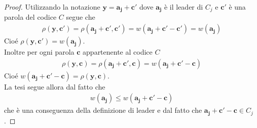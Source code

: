 \begin{proof}
    Utilizzando la notazione $\mathbf{y} = \mathbf{a_{j}} + \mathbf{c'}$ dove $\mathbf{a_{j}}$ è il leader di $C_{j}$ e $\mathbf{c'}$ è una parola del codice $C$ segue che
   \begin{align*}
      \rho (\mathbf{y} ,\mathbf{c'}) = \rho ( \mathbf{a_{j}} + \mathbf{c'} ,\mathbf{c'})
      = w(\mathbf{a_{j}} + \mathbf{c'} - \mathbf{c'}) = w(\mathbf{a_{j}})
   \end{align*}
   Cioé $\rho (\mathbf{y} ,\mathbf{c'}) = w(\mathbf{a_{j}})$. \\
   Inoltre per ogni parola $\mathbf{c}$ appartenente al codice $C$
   \begin{align*}
      \rho (\mathbf{y} ,\mathbf{c}) = \rho ( \mathbf{a_{j}} + \mathbf{c'} ,\mathbf{c})
      = w(\mathbf{a_{j}} + \mathbf{c'} - \mathbf{c})
   \end{align*}
   Cioé $w(\mathbf{a_{j}} + \mathbf{c'} - \mathbf{c}) = \rho(\mathbf{y} ,\mathbf{c})$. \\
   La tesi segue allora dal fatto che
   \begin{align*}
      w(\mathbf{a_{j}}) \leq w(\mathbf{a_{j}} + \mathbf{c'} - \mathbf{c})
   \end{align*}
   che è una conseguenza della definizione di leader e dal fatto che $\mathbf{a_{j}} + \mathbf{c'} - \mathbf{c} \in C_{j}$.
\end{proof}

